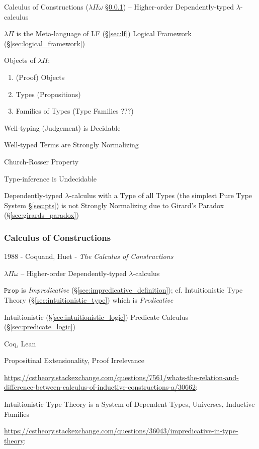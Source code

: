 Calculus of Constructions ($\lambda\Pi\omega$ \S\ref{sec:coc}) --
Higher-order Dependently-typed $\lambda$-calculus

$\lambda\Pi$ is the Meta-language of LF (\S\ref{sec:lf}) Logical
Framework (\S\ref{sec:logical_framework})

Objects of $\lambda\Pi$:
\begin{enumerate}
  \item (Proof) Objects
  \item Types (Propositions)
  \item Families of Types (Type Families ???)
\end{enumerate}

Well-typing (Judgement) is Decidable %

Well-typed Terms are Strongly Normalizing

Church-Rosser Property

\fist Type-inference is Undecidable %

Dependently-typed $\lambda$-calculus with a Type of all Types (the
simplest Pure Type System \S\ref{sec:pts}) is not
Strongly Normalizing due to Girard's Paradox
(\S\ref{sec:girards_paradox})



\subsubsection{Calculus of Constructions}\label{sec:coc}

1988 - Coquand, Huet - \emph{The Calculus of Constructions}

$\lambda\Pi\omega$ -- Higher-order Dependently-typed $\lambda$-calculus

$\mathtt{Prop}$ is \emph{Impredicative} (\S\ref{sec:impredicative_definition});
cf. Intuitionistic Type Theory (\S\ref{sec:intuitionistic_type}) which is
\emph{Predicative}

Intuitionistic (\S\ref{sec:intuitionistic_logic}) Predicate Calculus
(\S\ref{sec:predicate_logic})

Coq, Lean

Propositinal Extensionality, Proof Irrelevance

\url{https://cstheory.stackexchange.com/questions/7561/whats-the-relation-and-difference-between-calculus-of-inductive-constructions-a/30662}:

Intuitionistic Type Theory is a System of Dependent Types, Universes, Inductive
Families

\url{https://cstheory.stackexchange.com/questions/36043/impredicative-in-type-theory}:

